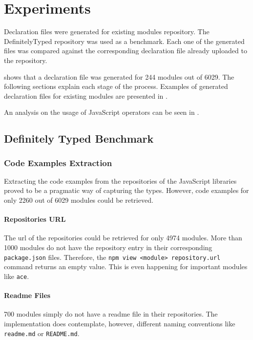 \chapter{Experiments}\label{chap:experiments}
Declaration files were generated for existing modules repository. The DefinitelyTyped repository was used as a benchmark. Each one of the generated files was compared against the corresponding declaration file already uploaded to the repository.

 shows that a declaration file was generated for 244 modules out of 6029. The following sections explain each stage of the process. Examples of generated declaration files for existing modules are presented in .



An analysis on the usage of JavaScript operators can be seen in .

\section{Definitely Typed Benchmark}



\subsection{Code Examples Extraction}
Extracting the code examples from the repositories of the JavaScript libraries proved to be a pragmatic way of capturing the types. However, code examples for only 2260 out of 6029 modules could be retrieved.

\subsubsection{Repositories URL}
The url of the repositories could be retrieved for only 4974 modules. More than 1000 modules do not have the repository entry in their corresponding \texttt{package.json} files. Therefore, the \texttt{npm view <module> repository.url} command returns an empty value. This is even happening for important modules like \texttt{ace}.

\subsubsection{Readme Files}
700 modules simply do not have a readme file in their repositories. The implementation does contemplate, however, different naming conventions like \texttt{readme.md} or \texttt{README.md}.


